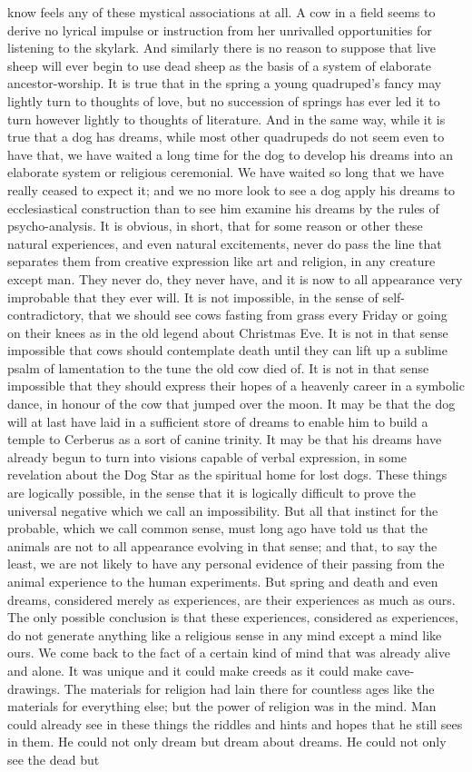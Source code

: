 know feels any of these mystical associations at all. A cow in a field seems to derive no lyrical impulse or instruction from her unrivalled opportunities for listening to the skylark. And similarly there is no reason to suppose that live sheep will ever begin to use dead sheep as the basis of a system of elaborate ancestor-worship. It is true that in the spring a young quadruped's fancy may lightly turn to thoughts of love, but no succession of springs has ever led it to turn however lightly to thoughts of literature. And in the same way, while it is true that a dog has dreams, while most other quadrupeds do not seem even to have that, we have waited a long time for the dog to develop his dreams into an elaborate system or religious ceremonial. We have waited so long that we have really ceased to expect it; and we no more look to see a dog apply his dreams to ecclesiastical construction than to see him examine his dreams by the rules of psycho-analysis. It is obvious, in short, that for some reason or other these natural experiences, and even natural excitements, never do pass the line that separates them from creative expression like art and religion, in any creature except man. They never do, they never have, and it is now to all appearance very improbable that they ever will. It is not impossible, in the sense of self-contradictory, that we should see cows fasting from grass every Friday or going on their knees as in the old legend about Christmas Eve. It is not in that sense impossible that cows should contemplate death until they can lift up a sublime psalm of lamentation to the tune the old cow died of. It is not in that sense impossible that they should express their hopes of a heavenly career in a symbolic dance, in honour of the cow that jumped over the moon. It may be that the dog will at last have laid in a sufficient store of dreams to enable him to build a temple to Cerberus as a sort of canine trinity. It may be that his dreams have already begun to turn into visions capable of verbal expression, in some revelation about the Dog Star as the spiritual home for lost dogs. These things are logically possible, in the sense that it is logically difficult to prove the universal negative which we call an impossibility. But all that instinct for the probable, which we call common sense, must long ago have told us that the animals are not to all appearance evolving in that sense; and that, to say the least, we are not likely to have any personal evidence of their passing from the animal experience to the human experiments. But spring and death and even dreams, considered merely as experiences, are their experiences as much as ours. The only possible conclusion is that these experiences, considered as experiences, do not generate anything like a religious sense in any mind except a mind like ours. We come back to the fact of a certain kind of mind that was already alive and alone. It was unique and it could make creeds as it could make cave-drawings. The materials for religion had lain there for countless ages like the materials for everything else; but the power of religion was in the mind. Man could already see in these things the riddles and hints and hopes that he still sees in them. He could not only dream but dream about dreams. He could not only see the dead but 